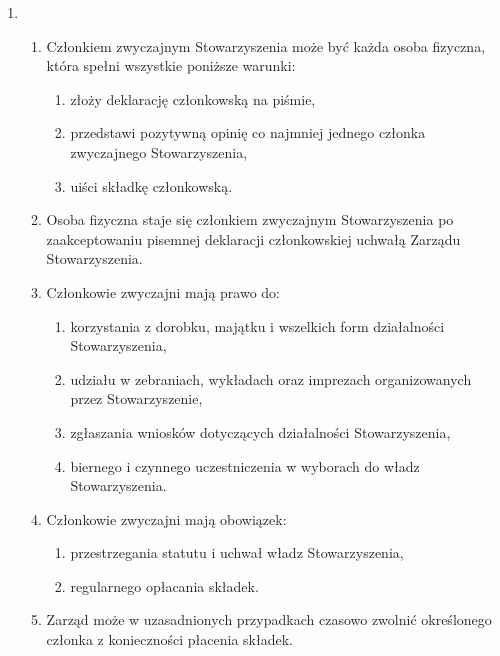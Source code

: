 \documentclass[chapterprefix,notitlepage]{article}
\begin{document}
\begin{enumerate}
	\item \begin{enumerate}
		\item Członkiem zwyczajnym Stowarzyszenia może być każda osoba fizyczna, która spełni wszystkie poniższe warunki:
		\begin{enumerate}
			\item złoży deklarację członkowską na piśmie,
			\item przedstawi pozytywną opinię co najmniej jednego członka zwyczajnego Stowarzyszenia,
			\item uiści składkę członkowską.
		\end{enumerate}
		\item Osoba fizyczna staje się członkiem zwyczajnym Stowarzyszenia po zaakceptowaniu pisemnej deklaracji członkowskiej uchwałą Zarządu Stowarzyszenia.
		\item Członkowie zwyczajni mają prawo do:
		\begin{enumerate}
			\item korzystania z dorobku, majątku i wszelkich form działalności Stowarzyszenia,
			\item udziału w zebraniach, wykładach oraz imprezach organizowanych przez Stowarzyszenie,
			\item zgłaszania wniosków dotyczących działalności Stowarzyszenia,
			\item biernego i czynnego uczestniczenia w wyborach do władz Stowarzyszenia.
		\end{enumerate}
		\item Członkowie zwyczajni mają obowiązek:
		\begin{enumerate}
			\item przestrzegania statutu i uchwał władz Stowarzyszenia,
			\item regularnego opłacania składek.
		\end{enumerate}
		\item Zarząd może w uzasadnionych przypadkach czasowo zwolnić określonego członka z konieczności płacenia składek.
	\end{enumerate}


\end{enumerate}
\end{document}
